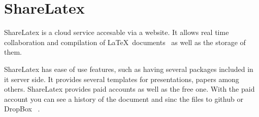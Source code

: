 \section{ShareLatex}

ShareLatex is a cloud service accesable via a website. It allows real time 
collaboration and compilation of 
\LaTeX~documents~\cite{www-hid-sp18-601-slatex-documentation} as well as the 
storage of them. 
 
ShareLatex has ease of use features, such as having several packages included 
in it server side. It provides several templates for presentations, papers among
 others. ShareLatex provides paid accounts as well as the free one. With the 
 paid account you can see a history of the document and sinc the files to github
 or DropBox ~\cite{www-hid-sp18-601-slatex-plans}.